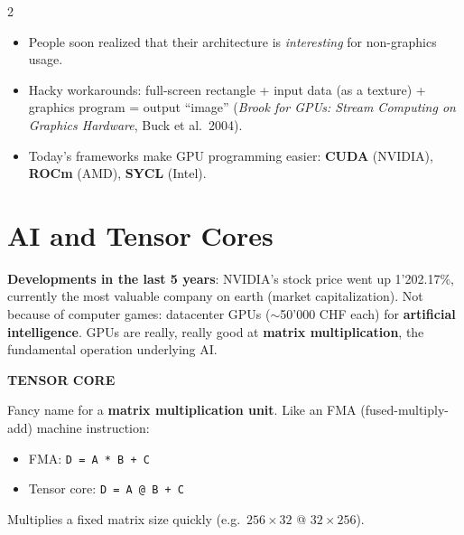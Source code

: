\documentclass[a4paper,9pt]{extarticle}
\begin{document}
\begin{multicols}{2}
\begin{example}
\begin{itemize}
\item People soon realized that their architecture is \emph{interesting} for non-graphics usage.

\item Hacky workarounds: full-screen rectangle + input data (as a texture) + graphics program =
output ``image'' (\emph{Brook for GPUs: Stream Computing on Graphics Hardware}, Buck et al.\
2004).

\item Today's frameworks make GPU programming easier: \textbf{CUDA} (NVIDIA), \textbf{ROCm}
(AMD), \textbf{SYCL} (Intel).

\end{itemize}

\end{example}



\section{AI and Tensor Cores}


\begin{example}

\textbf{Developments in the last 5 years}: NVIDIA's stock price went up 1'202.17\%, currently
the most valuable company on earth (market capitalization). Not because of computer games:
datacenter GPUs ($\sim$50'000 CHF each) for \textbf{artificial intelligence}. GPUs are really,
really good at \textbf{matrix multiplication}, the fundamental operation underlying AI.

\end{example}


\begin{definition}

\textbf{TENSOR CORE}

Fancy name for a \textbf{matrix multiplication unit}. Like an FMA (fused-multiply-add) machine
instruction:

\begin{itemize}

\item FMA: \texttt{D = A * B + C}

\item Tensor core: \texttt{D = A @ B + C}

\end{itemize}

Multiplies a fixed matrix size quickly (e.g.\ $256 \times 32$ @ $32 \times 256$).


\end{definition}
\end{multicols}
\end{document}
